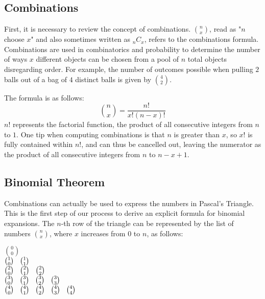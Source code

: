 \documentclass[11pt]{article}
\begin{document}

\subsection{Combinations}
First, it is necessary to review the concept of combinations. $n \choose x$, read as "$n$ choose $x$" and also sometimes written as $_nC_x$, refers to the combinations formula. Combinations are used in combinatorics and probability to determine the number of ways $x$ different objects can be chosen from a pool of $n$ total objects disregarding order. For example, the number of outcomes possible when pulling $2$ balls out of a bag of $4$ distinct balls is given by $4 \choose 2$.

The formula is as follows:
\[ {n \choose x} = \frac{n!}{x!(n-x)!} \]
$n!$ represents the factorial function, the product of all consecutive integers from $n$ to $1$. One tip when computing combinations is that $n$ is greater than $x$, so $x!$ is fully contained within $n!$, and can thus be cancelled out, leaving the numerator as the product of all consecutive integers from $n$ to $n-x+1$.


\subsection{Binomial Theorem}
Combinations can actually be used to express the numbers in Pascal's Triangle. This is the first step of our process to derive an explicit formula for binomial expansions. The $n$-th row of the triangle can be represented by the list of numbers $n \choose x$, where $x$ increases from $0$ to $n$, as follows:

\begin{center}
${0 \choose 0}$\\
${1 \choose 0}\hspace{0.3 cm}{1 \choose 1}$\\
${2 \choose 0}\hspace{0.3 cm}{2 \choose 1}\hspace{0.3 cm}{2 \choose 2}$\\
${3 \choose 0}\hspace{0.3 cm}{3 \choose 1}\hspace{0.3 cm}{3 \choose 2}\hspace{0.3 cm}{3 \choose 3}$\\
${4 \choose 0}\hspace{0.3 cm}{4 \choose 1}\hspace{0.3 cm}{4 \choose 2}\hspace{0.3 cm}{4 \choose 3}\hspace{0.3 cm}{4 \choose 4}$\\
\end{center}
\end{document}
